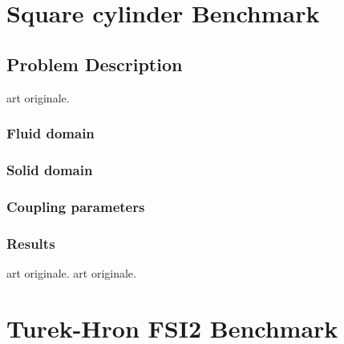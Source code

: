 \section{Square cylinder Benchmark}
\label{sec:sq-cyl-bench}

\subsection{Problem Description}

\cite{ramm1998fluid} art originale.


\subsubsection{Fluid domain}


\subsubsection{Solid domain}


\subsubsection{Coupling parameters}


\subsubsection{Results}

\cite{ramm1998fluid} art originale.
\cite{ramm1998fluid} art originale.
\cite{walhorn2002space}
\cite{matthies2003partitioned}
\cite{dettmer2006computational}
\cite{olivier2009fluid}
\cite{wood2010partitioned}
\cite{kassiotis2011nonlinear}
\cite{habchi2013partitioned}
\cite{froehle2014high}






















\section{Turek-Hron FSI2 Benchmark}
\label{sec:FSI2}
\cite{turek2006proposal}
























